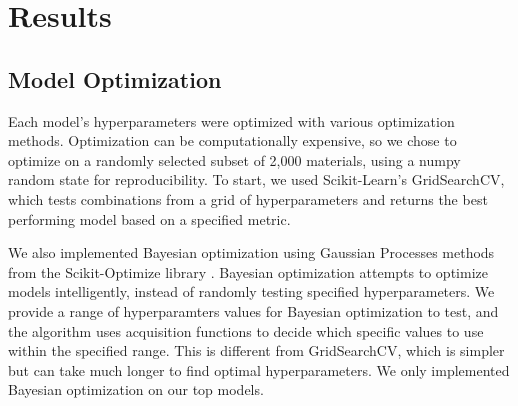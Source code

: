 \documentclass[twocolumn, nofootinbib, secnumarabic, amssymb, nobibnotes, aps, prd]{revtex4-2}
\begin{document}
\section{Results}
\subsection{Model Optimization}
Each model's hyperparameters were optimized with various optimization methods. Optimization can be computationally expensive, so we chose to optimize on a randomly selected subset of 2,000 materials, using a numpy random state for reproducibility. To start, we used Scikit-Learn's GridSearchCV, which tests combinations from a grid of hyperparameters and returns the best performing model based on a specified metric. 

We also implemented Bayesian optimization using Gaussian Processes methods from the Scikit-Optimize library \cite{head_tim_2021_5565057}. Bayesian optimization attempts to optimize models intelligently, instead of randomly testing specified hyperparameters. We provide a range of hyperparamters values for Bayesian optimization to test, and the algorithm uses acquisition functions to decide which specific values to use within the specified range. This is different from GridSearchCV, which is simpler but can take much longer to find optimal hyperparameters. We only implemented Bayesian optimization on our top models.
\end{document}
